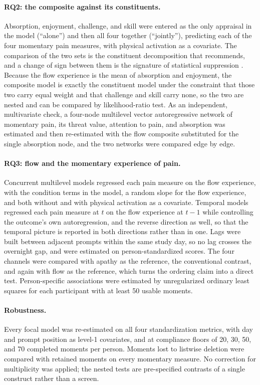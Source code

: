 \documentclass[11pt,a4paper]{article}
\begin{document}
\paragraph{RQ2: the composite against its constituents.} Absorption, enjoyment, challenge, and
skill were entered as the only appraisal in the model (``alone'') and then all four together
(``jointly''), predicting each of the four momentary pain measures, with physical activation as a
covariate. The comparison of the two sets is the constituent decomposition that
\citet{vanderweele2022constructed} recommends, and a change of sign between them is the signature
of statistical suppression \citep{mackinnon2000equivalence}. Because the flow experience is the
mean of absorption and enjoyment, the composite model is exactly the constituent model under the
constraint that those two carry equal weight and that challenge and skill carry none, so the two
are nested and can be compared by likelihood-ratio test. As an independent, multivariate check, a
four-node multilevel vector autoregressive network \citep{epskamp2018gaussian} of momentary pain,
its threat value, attention to pain, and absorption was estimated and then re-estimated with the
flow composite substituted for the single absorption node, and the two networks were compared edge
by edge.

\paragraph{RQ3: flow and the momentary experience of pain.} Concurrent multilevel models regressed
each pain measure on the flow experience, with the condition terms in the model, a random slope for
the flow experience, and both without and with physical activation as a covariate. Temporal models
regressed each pain measure at $t$ on the flow experience at $t-1$ while controlling the outcome's
own autoregression, and the reverse direction as well, so that the temporal picture is reported in
both directions rather than in one. Lags were built between adjacent prompts within the same study
day, so no lag crosses the overnight gap, and were estimated on person-standardized scores. The
four channels were compared with apathy as the reference, the conventional contrast, and again with
flow as the reference, which turns the ordering claim into a direct test. Person-specific
associations were estimated by unregularized ordinary least squares for each participant with at
least 50 usable moments.

\paragraph{Robustness.} Every focal model was re-estimated on all four standardization metrics,
with day and prompt position as level-1 covariates, and at compliance floors of 20, 30, 50, and 70
completed moments per person. Moments lost to listwise deletion were compared with retained moments
on every momentary measure. No correction for multiplicity was applied; the nested tests are
pre-specified contrasts of a single construct rather than a screen.
\end{document}
